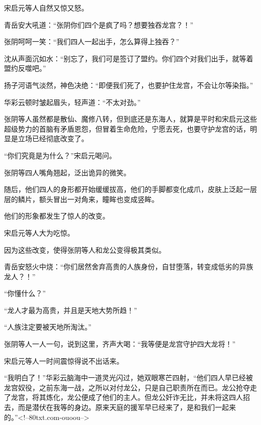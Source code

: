 \begin{this_body}
宋启元等人自然又惊又怒。

青岳安大吼道：“张阴你们四个是疯了吗？想要独吞龙宫？！”

张阴呵呵一笑：“我们四人一起出手，怎么算得上独吞？”

沈从声面沉如水：“别忘了，我们可是签订了盟约。你们四个对我们出手，就等着盟约反噬吧。”

扬子河语气淡然，神色决绝：“即便我们死了，也要护住龙宫，不会让尔等染指。”

华彩云顿时皱起眉头，轻声道：“不太对劲。”

张阴等人虽然都是散仙、魔修八转，但到底还是东海人，就算是平时和宋启元这些超级势力的首脑有矛盾恩怨，但冒着生命危险，宁愿去死，也要守护龙宫的话，明显是立场已经彻底改变了。

“你们究竟是为什么？”宋启元喝问。

张阴等四人嘴角翘起，泛出诡异的微笑。

随后，他们四人的身形都开始缓缓拔高，他们的手脚都变化成爪，皮肤上泛起一层层的鳞片，额头冒出一对角来，瞳眸也变成竖眸。

他们的形象都发生了惊人的改变。

宋启元等人大为吃惊。

因为这些改变，使得张阴等人和龙公变得极其类似。

青岳安怒火中烧：“你们居然舍弃高贵的人族身份，自甘堕落，转变成低劣的异族龙人？！”

“你懂什么？”

“龙人才最为高贵，并且是天地大势所趋！”

“人族注定要被天地所淘汰。”

张阴等人一人一句，说到这里，齐声大喝：“我等便是龙宫守护四大龙将！”

宋启元等人一时间震惊得说不出话来。

“我明白了！”华彩云脑海中一道灵光闪过，她双眼寒芒四射，“他们四人早已经被龙宫奴役，之前东海一战，之所以对付龙公，只是自己职责所在而已。龙公抢夺走了龙宫，将其炼化，龙公便成了他们的主人。但龙公奸诈无比，并未将这四人招去，而是潜伏在我等的身边。原来天庭的援军早已经来了，是和我们一起来的。”<!--80txt.com-ouoou-->

\end{this_body}

